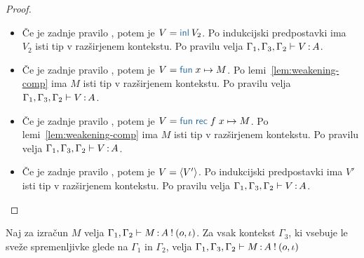 \begin{proof}
\begin{itemize}
		\item Če je zadnje pravilo , potem je $V = \tminl{V_2}$. Po indukcijski predpostavki ima $V_2$ isti tip v razširjenem kontekstu.
		Po pravilu  velja $\Gamma_1, \Gamma_3, \Gamma_2 \vdash V \mathinner{:} A$.
		
		\item Če je zadnje pravilo , potem je $V = \tmfunano{x}{M}$. Po lemi~\ref{lem:weakening-comp} ima $M$ isti tip v razširjenem kontekstu.
		Po pravilu  velja $\Gamma_1, \Gamma_3, \Gamma_2 \vdash V \mathinner{:} A$.
		
		\item Če je zadnje pravilo , potem je $V = \tmfunrecano{f}{x}{M}$. Po lemi~\ref{lem:weakening-comp} ima $M$ isti tip v razširjenem kontekstu.
		Po pravilu  velja $\Gamma_1, \Gamma_3, \Gamma_2 \vdash V \mathinner{:} A$.
		
		\item Če je zadnje pravilo , potem je $V = \langle V' \rangle$. Po indukcijski predpostavki ima $V'$ isti tip v razširjenem kontekstu.
		Po pravilu  velja $\Gamma_1, \Gamma_3, \Gamma_2 \vdash V \mathinner{:} A$.
	\end{itemize}
\end{proof}

\begin{lema}\label{lem:weakening-comp}
	Naj za izračun $M$ velja $\Gamma_1, \Gamma_2 \vdash M \mathinner{:} A \mathbin{!} (o, \iota)$. Za vsak kontekst $\Gamma_3$, ki vsebuje le sveže spremenljivke glede na $\Gamma_1$ in $\Gamma_2$, velja $\Gamma_1, \Gamma_3, \Gamma_2 \vdash M \mathinner{:} A \mathbin{!} (o, \iota)$
\end{lema}

